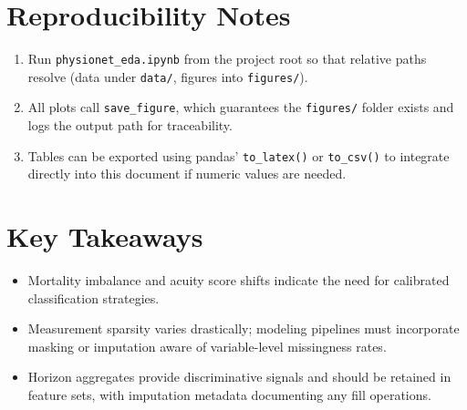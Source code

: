 \documentclass[11pt]{article}
\begin{document}
\section{Reproducibility Notes}
\begin{enumerate}[noitemsep]
    \item Run \texttt{physionet\_eda.ipynb} from the project root so that relative paths resolve (data under \texttt{data/}, figures into \texttt{figures/}).
    \item All plots call \texttt{save\_figure}, which guarantees the \texttt{figures/} folder exists and logs the output path for traceability.
    \item Tables can be exported using pandas' \texttt{to\_latex()} or \texttt{to\_csv()} to integrate directly into this document if numeric values are needed.
\end{enumerate}

\section{Key Takeaways}
\begin{itemize}[noitemsep]
    \item Mortality imbalance and acuity score shifts indicate the need for calibrated classification strategies.
    \item Measurement sparsity varies drastically; modeling pipelines must incorporate masking or imputation aware of variable-level missingness rates.
    \item Horizon aggregates provide discriminative signals and should be retained in feature sets, with imputation metadata documenting any fill operations.
\end{itemize}
\end{document}
